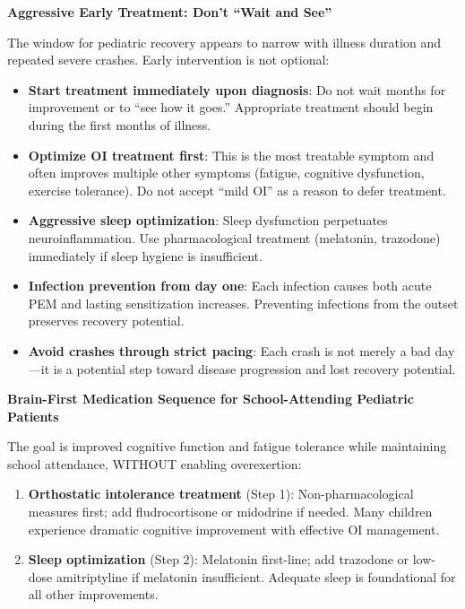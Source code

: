 \begin{protocol}
\label{protocol:ped-early-intervention-window}

\textbf{Aggressive Early Treatment: Don't ``Wait and See''}

The window for pediatric recovery appears to narrow with illness duration and repeated severe crashes. Early intervention is not optional:

\begin{itemize}
    \item \textbf{Start treatment immediately upon diagnosis}: Do not wait months for improvement or to ``see how it goes.'' Appropriate treatment should begin during the first months of illness.
    \item \textbf{Optimize OI treatment first}: This is the most treatable symptom and often improves multiple other symptoms (fatigue, cognitive dysfunction, exercise tolerance). Do not accept ``mild OI'' as a reason to defer treatment.
    \item \textbf{Aggressive sleep optimization}: Sleep dysfunction perpetuates neuroinflammation. Use pharmacological treatment (melatonin, trazodone) immediately if sleep hygiene is insufficient.
    \item \textbf{Infection prevention from day one}: Each infection causes both acute PEM and lasting sensitization increases. Preventing infections from the outset preserves recovery potential.
    \item \textbf{Avoid crashes through strict pacing}: Each crash is not merely a bad day---it is a potential step toward disease progression and lost recovery potential.
\end{itemize}

\textbf{Brain-First Medication Sequence for School-Attending Pediatric Patients}

The goal is improved cognitive function and fatigue tolerance while maintaining school attendance, WITHOUT enabling overexertion:

\begin{enumerate}
    \item \textbf{Orthostatic intolerance treatment} (Step 1): Non-pharmacological measures first; add fludrocortisone or midodrine if needed. Many children experience dramatic cognitive improvement with effective OI management.

    \item \textbf{Sleep optimization} (Step 2): Melatonin first-line; add trazodone or low-dose amitriptyline if melatonin insufficient. Adequate sleep is foundational for all other improvements.


\end{enumerate}
\end{protocol}
